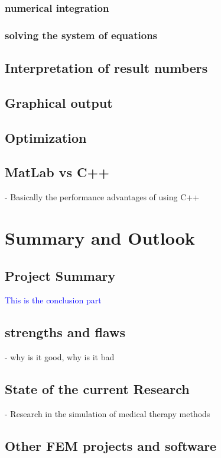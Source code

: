 \documentclass[parskip=half, titlepage=yes, 12pt, BCOR=12mm, DIV=calc]{scrartcl}
\begin{document}
\subsubsection{numerical integration}
\subsubsection{solving the system of equations}

\subsection{Interpretation of result numbers}

\subsection{Graphical output}

\subsection{Optimization}

\subsection{MatLab vs C++}

- Basically the performance advantages of using C++


\section{Summary and Outlook}

\subsection{Project Summary}

\textcolor{blue}
{
This is the conclusion part
}

\subsection{strengths and flaws}
- why is it good, why is it bad

\subsection{State of the current Research}
- Research in the simulation of medical therapy methods \\

\subsection{Other FEM projects and software}


\newpage


\clearpage
\nocite{*}
\printbibliography

\newpage

\appendix

 
\end{document}
